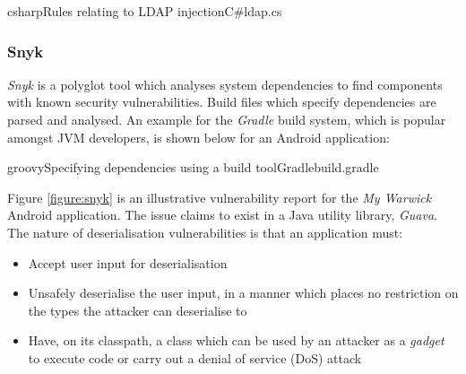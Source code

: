 \documentclass[a4paper,openany,12pt]{book}
\begin{document}
\begin{mycodefile}{csharp}{\label{code:scs:3}Rules relating to LDAP injection}{C\#}{ldap.cs}
\end{mycodefile}

\subsubsection{Snyk}

\emph{Snyk} is a polyglot tool which analyses system dependencies to find components with known security vulnerabilities.
Build files which specify dependencies are parsed and analysed.
An example for the \emph{Gradle} build system, which is popular amongst JVM developers, is shown below for an Android
application:

\begin{mycodefile}{groovy}{\label{code:gradle:1}Specifying dependencies using a build tool}{Gradle}{build.gradle}
\end{mycodefile}

Figure \ref{figure:snyk} is an illustrative vulnerability report for the \emph{My Warwick} Android application.
The issue claims to exist in a Java utility library, \emph{Guava}.
The nature of deserialisation vulnerabilities is that an application must:

\begin{itemize}
    \item Accept user input for deserialisation
    \item Unsafely deserialise the user input, in a manner which places no restriction on the types the attacker can
          deserialise to
    \item Have, on its classpath, a class which can be used by an attacker as a \emph{gadget} to execute code or carry
          out a denial of service (DoS) attack
\end{itemize}
\end{document}
